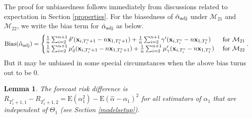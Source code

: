 \documentclass[11pt]{article}
\def\mbf#1{\mathbf{#1}} %
\def\mrm#1{\mathrm{#1}} %
\def\mc#1{\mathcal{#1}} %
\def\E#1{\mathrm{E}(#1)} %
\newtheorem{lem}{Lemma}
\theoremstyle{definition}
\newenvironment{proof-of-proposition}[1][{}]{\noindent{\bf
    Proof of Proposition {#1}}
  \hspace*{.5em}}{\qed\bigskip\\}
\begin{document}
\begin{proof-of-proposition}[\ref{unbiased}] The proof for unbiasedness follows immediately from discussions related to expectation in Section \ref{properties}. For the biasedness of  $\hat{\alpha}_{\rm adj}$ under $\mc{M}_{21}$ and $\mc{M}_{22}$, we write the bias term for $\hat{\alpha}_{\rm adj}$ as below.
\begin{align*}
  \mrm{Bias}(\hat{\alpha}_{\rm adj}) = 
  \begin{cases}
       \frac{1}{n} \sum_{i=2}^{n+1} \delta'(\mbf{x}_{i, T_i^*+1}-n\mbf{x}_{1, T_1^*+1}) +  \frac{1}{n} \sum_{i=2}^{n+1} \gamma'(\mbf{x}_{i, T_i^*}-n\mbf{x}_{1, T_1^*}) & \text{ for } \mc{M}_{21}\\
    \frac{1}{n} \sum_{i=2}^{n+1} \mu_{\delta}'(\mbf{x}_{i, T_i^*+1}-n\mbf{x}_{1, T_1^*+1}) +  \frac{1}{n} \sum_{i=2}^{n+1} \mu_{\gamma}'(\mbf{x}_{i, T_i^*}-n\mbf{x}_{1, T_1^*}) & \text{ for }\mc{M}_{22}
  \end{cases}.
\end{align*}
But it may be unbiased in some special circumstances when the above bias turns out to be 0. \end{proof-of-proposition}

\begin{lem}
  \label{risklemma} The forecast risk difference is $R_{T_1^*+1,1}-R_{T_1^*+1,2}=\E{\alpha_1^2}-\E{\hat{\alpha}-\alpha_1}^2$ for all estimators of $\alpha_1$ that are independent of $\Theta_1$ (see Section \ref{modelsetup}).
\end{lem}
\end{document}
